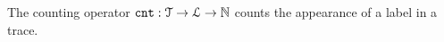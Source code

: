 The counting operator $\mathtt{cnt} : \mathcal{T} \to \mathcal{L} \to \mathbb{N}$
counts the appearance of a label in a trace.

